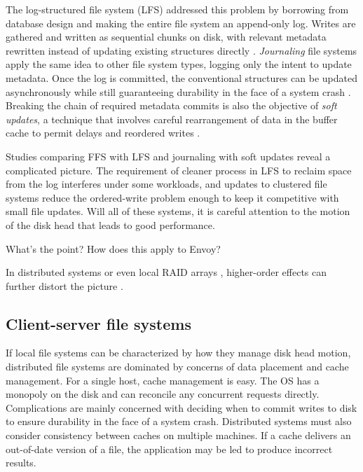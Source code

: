 The log-structured file system (LFS) addressed this problem by borrowing from database design and making the entire file system an append-only log. Writes are gathered and written as sequential chunks on disk, with relevant metadata rewritten instead of updating existing structures directly \cite{rosenblum}. \emph{Journaling} file systems apply the same idea to other file system types, logging only the intent to update metadata. Once the log is committed, the conventional structures can be updated asynchronously while still guaranteeing durability in the face of a system crash \cite{hagmann,sweeney,tweedie}. Breaking the chain of required metadata commits is also the objective of \emph{soft updates}, a technique that involves careful rearrangement of data in the buffer cache to permit delays and reordered writes \cite{ganger94}.

Studies comparing FFS with LFS \cite{seltzer95} and journaling with soft updates \cite{seltzer00} reveal a complicated picture. The requirement of cleaner process in LFS to reclaim space from the log interferes under some workloads, and updates to clustered file systems reduce the ordered-write problem enough to keep it competitive with small file updates. Will all of these systems, it is careful attention to the motion of the disk head that leads to good performance.

What's the point?  How does this apply to Envoy?

In distributed systems or even local RAID arrays \cite{patterson}, higher-order effects can further distort the picture \cite{stein05}.

\subsection{Client-server file systems}

If local file systems can be characterized by how they manage disk head motion, distributed file systems are dominated by concerns of data placement and cache management. For a single host, cache management is easy. The OS has a monopoly on the disk and can reconcile any concurrent requests directly. Complications are mainly concerned with deciding when to commit writes to disk to ensure durability in the face of a system crash. Distributed systems must also consider consistency between caches on multiple machines. If a cache delivers an out-of-date version of a file, the application may be led to produce incorrect results.

